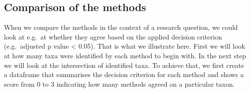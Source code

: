 \documentclass[
]{book}
\begin{document}
\hypertarget{comparison-of-the-methods}{%
\subsection{Comparison of the methods}\label{comparison-of-the-methods}}

When we compare the methods in the context of a research question, we could
look at e.g.~at whether they agree based on the applied decision criterion
(e.g.~adjusted p value \textless{} 0.05). That is what we illustrate here. First we will
look at how many taxa were identified by each method to begin with. In the next
step we will look at the intersection of identified taxa. To achieve that, we
first create a dataframe that summarises the decision criterion for each method
and shows a score from 0 to 3 indicating how many methods agreed on a particular
taxon.
\end{document}
